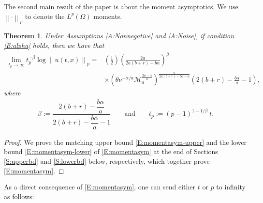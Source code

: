 \documentclass[a4paper,11pt]{article}
\numberwithin{equation}{section}
\numberwithin{equation}{section}
\theoremstyle{plain}
\newtheorem{theorem}{Theorem}[section]
\theoremstyle{definition}
\newcommand{\Norm}[1]{\left\|  #1   \right\|}
\begin{document}
The second main result of the paper is about the moment asymptotics. We use $\Norm{\cdot}_p$ to
denote the $L^p(\Omega)$ moments.


\begin{theorem} \label{T:asym}
  Under Assumptions \ref{A:Nonnegative} and \ref{A:Noise}, if condition \eqref{E:alpha} holds, then
  we have that
  \begin{equation}
    \label{E:momentasym}
    \begin{aligned}
      \lim_{t_p \to \infty} t_p^{-\beta} \log \Norm{u(t,x)}_p =
      & \left(\frac{1}{2}\right)\left(\frac{2a}{2a(b+r)- b\alpha} \right)^\beta \\
      & \times \left(\theta\nu^{-\alpha/a} \mathcal{M}_a^{\frac{2a-\alpha}{a}}\right)^{\frac{a}{2a(b+r)-b\alpha-a}}\left(2(b+r)-\frac{b\alpha}{a}-1\right),
    \end{aligned}
  \end{equation}
  where
  \begin{align}
    \label{E:beta-tp}
    \beta := \dfrac{2(b+r)-\dfrac{b\alpha}{a}}{ 2(b+r)-\dfrac{b\alpha}{a} -1 } \qquad \text{and} \qquad
    t_p   := (p-1)^{1-1/\beta} \: t.
  \end{align}
\end{theorem}
\begin{proof}
  We prove the matching upper bound \eqref{E:momentasym-upper} and the lower bound
  \eqref{E:momentasym-lower} of \eqref{E:momentasym} at the end of Sections \ref{S:upperbd} and
  \ref{S:lowerbd} below, respectively, which together prove \eqref{E:momentasym}.
\end{proof}

As a direct consequence of \eqref{E:momentasym}, one can send either $t$ or $p$ to infinity as follows:
\end{document}
